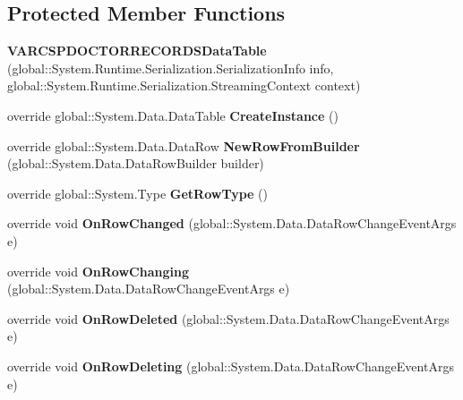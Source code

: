 \subsection*{Protected Member Functions}
\begin{CompactItemize}
\item 
\textbf{VARCSPDOCTORRECORDSDataTable} (global::System.Runtime.Serialization.SerializationInfo info, global::System.Runtime.Serialization.StreamingContext context)\label{class_automatic_medical_system_1_1_data_set1_1_1_v_a_r_c_s_p_d_o_c_t_o_r_r_e_c_o_r_d_s_data_table_36d9ecf161d3e26e0443039208ee8a9c}

\item 
override global::System.Data.DataTable \textbf{CreateInstance} ()\label{class_automatic_medical_system_1_1_data_set1_1_1_v_a_r_c_s_p_d_o_c_t_o_r_r_e_c_o_r_d_s_data_table_66fe245bd36249975102ec15ff235a99}

\item 
override global::System.Data.DataRow \textbf{NewRowFromBuilder} (global::System.Data.DataRowBuilder builder)\label{class_automatic_medical_system_1_1_data_set1_1_1_v_a_r_c_s_p_d_o_c_t_o_r_r_e_c_o_r_d_s_data_table_5fc6a88b66fec2f3a22a89ba4d1fe1e0}

\item 
override global::System.Type \textbf{GetRowType} ()\label{class_automatic_medical_system_1_1_data_set1_1_1_v_a_r_c_s_p_d_o_c_t_o_r_r_e_c_o_r_d_s_data_table_df510a0343271795962e9aebce174e26}

\item 
override void \textbf{OnRowChanged} (global::System.Data.DataRowChangeEventArgs e)\label{class_automatic_medical_system_1_1_data_set1_1_1_v_a_r_c_s_p_d_o_c_t_o_r_r_e_c_o_r_d_s_data_table_a8b1b33bf91ae8c9d1b2b3c52d4cfeae}

\item 
override void \textbf{OnRowChanging} (global::System.Data.DataRowChangeEventArgs e)\label{class_automatic_medical_system_1_1_data_set1_1_1_v_a_r_c_s_p_d_o_c_t_o_r_r_e_c_o_r_d_s_data_table_78169011eef86c906b5e5377d0f1e75e}

\item 
override void \textbf{OnRowDeleted} (global::System.Data.DataRowChangeEventArgs e)\label{class_automatic_medical_system_1_1_data_set1_1_1_v_a_r_c_s_p_d_o_c_t_o_r_r_e_c_o_r_d_s_data_table_1af347fcce2b94a781ae5dd4d19b3f43}

\item 
override void \textbf{OnRowDeleting} (global::System.Data.DataRowChangeEventArgs e)\label{class_automatic_medical_system_1_1_data_set1_1_1_v_a_r_c_s_p_d_o_c_t_o_r_r_e_c_o_r_d_s_data_table_a09f5ee6c38b3fc5b956ac697f10cbaf}

\end{CompactItemize}
